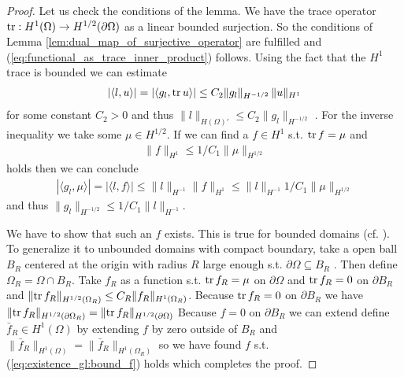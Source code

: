 \documentclass[../master_thesis.tex]{subfiles}
\begin{document}
\begin{proof}
    Let us check the conditions of the lemma. We have the trace operator 
    $\operatorname{tr}: H^1(\Omega) \rightarrow H^{1/2}(\partial \Omega)$ as a 
    linear bounded surjection. So the conditions of 
    Lemma \ref{lem:dual_map_of_surjective_operator} are fulfilled 
    and (\ref{eq:functional_as_trace_inner_product}) follows.
    Using the fact that the $H^1$ trace is bounded we can estimate 
    \begin{align*}
        |\langle l, u \rangle| = |\langle g_l, \operatorname{tr} u \rangle|
        \leq C_2 \lVert g_l \rVert _{H^{-1/2}} \, \lVert u \rVert _{H^1} 
    \end{align*}
    for some constant $C_2>0$
    and thus $\lVert l \rVert _{H(\Omega)'} \leq C_2 \lVert g_l \rVert _{H^{-1/2}}$ . 
    For the inverse inequality
    we take some $\mu \in H^{1/2}$. If we can find a $f \in H^1$ s.t. $\operatorname{tr} f = \mu$ and 
    \begin{align}
        \lVert f \rVert _{H^1} \leq 1/C_1 \lVert \mu \rVert _{H^{1/2}}\label{eq:existence_gl:bound_f}
    \end{align}
    holds then we can conclude
    \begin{align*}
        |\langle g_l, \mu \rangle| = |\langle l, f \rangle|
        \leq \lVert l \rVert _{H^{-1}} \lVert f \rVert _{H^1}
        \leq \lVert l \rVert _{H^{-1}} 1/C_1 \lVert \mu \rVert _{H^{1/2}}
    \end{align*}
    and thus $\lVert g_l \rVert _{H^{-1/2}} \leq 1/C_1 \lVert l \rVert _{H^{-1}}$.

    We have to show that such an $f$ exists. This is true for bounded domains (cf. \cite[Thm.\,3.10]{ern_guermond}).
    To generalize it to unbounded domains with compact boundary, take a open ball $B_R$ centered at the 
    origin with radius $R$ large enough s.t. $\partial \Omega \subseteq B_R$ . 
    Then define 
    $\Omega_R = \Omega \cap B_R$.
    Take $f_R$ as a function s.t. $\operatorname{tr} f_R = \mu$ on $\partial \Omega$ and 
    $\operatorname{tr} f_R = 0$ on $\partial B_R$ and $\lVert \operatorname{tr} f_R \rVert _{H^{1/2}(\Omega_R)}
    \leq C_R \lVert f_R \rVert _{H^1(\Omega_R)}$. Because $\operatorname{tr} f_R = 0$ on $\partial B_R$ 
    we have $\lVert \operatorname{tr} f_R \rVert _{H^{1/2}(\partial \Omega_R)} 
    = \lVert \operatorname{tr} f_R \rVert _{H^{1/2}(\partial \Omega)}$
    Because 
    $f= 0$ on $\partial B_R$ we can extend define $\bar{f}_R \in H^1(\Omega)$ by 
    extending $f$ by zero outside of $B_R$ and 
    $\lVert \bar{f}_R \rVert _{H^1(\Omega)} = \lVert \bar{f}_R \rVert _{H^1(\Omega_R)}$
    so we have found $f$ s.t. (\ref{eq:existence_gl:bound_f}) holds which completes the proof.
\end{proof}
\end{document}
